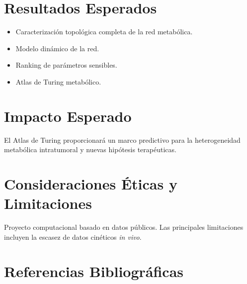\documentclass[12pt,spanish]{article}
\begin{document}
	
	\section{Resultados Esperados}
	
	\begin{itemize}
		\item Caracterización topológica completa de la red metabólica.
		\item Modelo dinámico de la red.
		\item Ranking de parámetros sensibles.
		\item Atlas de Turing metabólico.
	\end{itemize}
	
	\section{Impacto Esperado}
	
	El Atlas de Turing proporcionará un marco predictivo para la heterogeneidad metabólica intratumoral y nuevas hipótesis terapéuticas.
	
	\section{Consideraciones Éticas y Limitaciones}
	
	Proyecto computacional basado en datos públicos. Las principales limitaciones incluyen la escasez de datos cinéticos \textit{in vivo}.
	
	\section{Referencias Bibliográficas}
	
	
	
\end{document}
